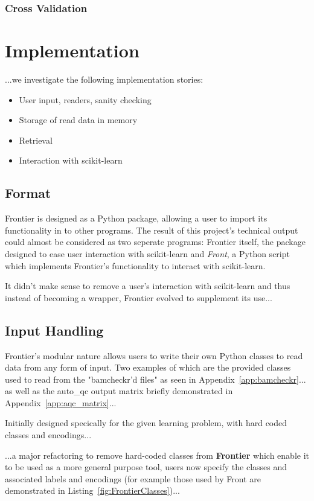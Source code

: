 \subsubsection{Cross Validation}

\section{Implementation}
...we investigate the following implementation stories:

\begin{itemize}
    \item User input, readers, sanity checking
    \item Storage of read data in memory
    \item Retrieval
    \item Interaction with scikit-learn
\end{itemize}

\subsection{Format}
Frontier is designed as a Python package, allowing a user to import its
functionality in to other programs. The result of this project's technical
output could almost be considered as two seperate programs: Frontier itself, the
package designed to ease user interaction with scikit-learn and \textit{Front},
a Python script which implements Frontier's functionality to interact with
scikit-learn.

It didn't make sense to remove a user's interaction with scikit-learn and thus
instead of becoming a wrapper, Frontier evolved to supplement its use...

\subsection{Input Handling}
Frontier's modular nature allows users to write their own Python classes to read
data from any form of input. Two examples of which are the provided classes used
to read from the "bamcheckr'd files" as seen in Appendix~\ref{app:bamcheckr}...
as well as the auto\_qc output matrix briefly demonstrated in Appendix~\ref{app:aqc_matrix}...

Initially designed specically for the given learning problem, with hard coded
classes and encodings...

...a major refactoring to remove hard-coded classes from \textbf{Frontier} which
enable it to be used as a more general purpose tool, users now specify the
classes and associated labels and encodings (for example those used by Front are
demonstrated in Listing~\ref{fig:FrontierClasses})...


